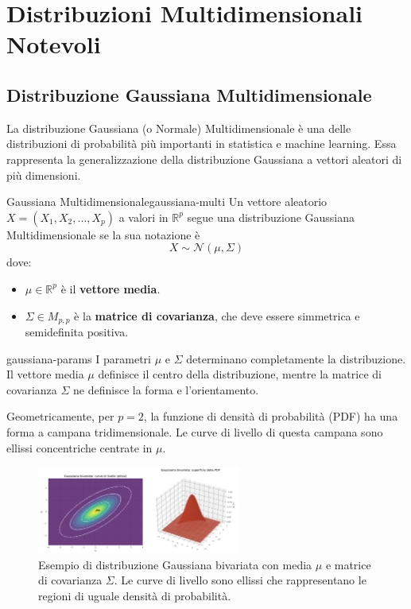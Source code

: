 \section{Distribuzioni Multidimensionali Notevoli}

\subsection{Distribuzione Gaussiana Multidimensionale}

La distribuzione Gaussiana (o Normale) Multidimensionale è una delle
distribuzioni di probabilità più importanti in statistica e machine learning.
Essa rappresenta la generalizzazione della distribuzione Gaussiana a vettori
aleatori di più dimensioni.

\begin{definizione}{Gaussiana Multidimensionale}{gaussiana-multi}
Un vettore aleatorio $X = (X_1, X_2, \dots, X_p)$ a valori in $\mathbb{R}^p$
segue una distribuzione Gaussiana Multidimensionale se la sua notazione è
$$
X \sim \mathcal{N}(\mu, \Sigma)
$$
dove:
\begin{itemize}
    \item $\mu \in \mathbb{R}^p$ è il \textbf{vettore media}.
    \item $\Sigma \in M_{p,p}$ è la \textbf{matrice di covarianza}, che deve
    essere simmetrica e semidefinita positiva.
\end{itemize}
\end{definizione}

\begin{nota}{}{gaussiana-params}
I parametri $\mu$ e $\Sigma$ determinano completamente la distribuzione. Il
vettore media $\mu$ definisce il centro della distribuzione, mentre la matrice
di covarianza $\Sigma$ ne definisce la forma e l'orientamento.
\end{nota}

Geometricamente, per $p=2$, la funzione di densità di probabilità (PDF) ha una
forma a campana tridimensionale. Le curve di livello di questa campana sono
ellissi concentriche centrate in $\mu$.

\begin{figure}[H]
    \centering
    \includegraphics[width=0.6\textwidth]{images/th_10_12/gaussiana_multidimensionale_2d3d.png}
    \caption{Esempio di distribuzione Gaussiana bivariata con media $\mu$ e matrice di covarianza $\Sigma$. Le curve di livello sono ellissi che rappresentano le regioni di uguale densità di probabilità.}
    \label{fig:gaussiana_bivariata}
\end{figure}

